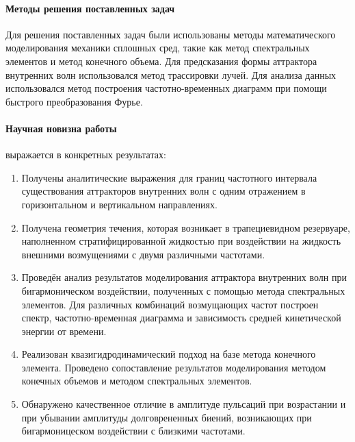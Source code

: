 \documentclass[utf8x]{G7-32} %
\begin{document}
\newpage

\paragraph{Методы решения поставленных задач}

Для решения поставленных задач были использованы методы математического моделирования механики сплошных сред, такие как метод спектральных элементов и метод конечного объема. Для предсказания формы аттрактора внутренних волн использовался метод трассировки лучей. Для анализа данных использовался метод построения частотно-временных диаграмм при помощи быстрого преобразования Фурье.

\paragraph{Научная новизна работы} выражается в конкретных результатах:
\begin{enumerate}[1.]
  \item Получены аналитические выражения для границ частотного интервала существования аттракторов внутренних волн с одним отражением в горизонтальном и вертикальном направлениях.%
    
  \item Получена геометрия течения, которая возникает в трапециевидном резервуаре, наполненном стратифицированной жидкостью при воздействии на жидкость внешними возмущениями с двумя различными частотами. 
    
  \item Проведён анализ результатов моделирования аттрактора внутренних волн при бигармоническом воздействии, полученных с помощью метода спектральных элементов. Для различных комбинаций возмущающих частот построен спектр, частотно-временная диаграмма и зависимость средней кинетической энергии от времени. 
    
  \item Реализован квазигидродинамический подход на базе метода конечного элемента. Проведено сопоставление результатов моделирования методом конечных объемов и методом спектральных элементов.

  \item Обнаружено качественное отличие в амплитуде пульсаций при возрастании и при убывании амплитуды долговрененных биений, возникающих при бигармоницеском воздействии с близкими частотами.

\end{enumerate}
\end{document}
